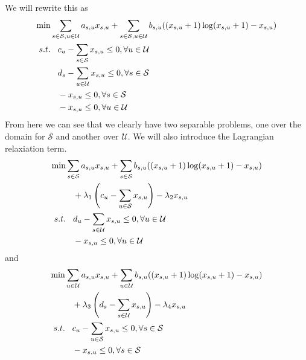 \documentclass[12pt,letter]{article}
\begin{document}
We will rewrite this as
\begin{align*}
\min\hspace{3mm}&\hspace{-3mm}\sum\limits_{s\in\mathcal{S},u\in\mathcal{U}}a_{s,u}x_{s,u} + 
	\sum\limits_{s\in\mathcal{S},u\in\mathcal{U}}b_{s,u}((x_{s,u}+1)\log(x_{s,u}+1)-x_{s,u})\\
s.t.\hspace{3mm} &c_u - \sum\limits_{s\in\mathcal{S}}x_{s,u}\leq 0, \forall u\in\mathcal{U}\\ 
     &d_s - \sum\limits_{u\in\mathcal{U}}x_{s,u}\leq 0, \forall s\in\mathcal{S}\\
     &-x_{s,u}\leq 0, \forall s\in\mathcal{S}\\
     &-x_{s,u}\leq 0, \forall u\in\mathcal{U}
\end{align*}
From here we can see that we clearly have two separable problems, one over the
domain for $\mathcal{S}$ and another over $\mathcal{U}$. We will also introduce
the Lagrangian relaxiation term.
\begin{align*}
\min\hspace{3mm}&\hspace{-3mm}\sum\limits_{s\in\mathcal{S}}a_{s,u}x_{s,u} + 
	\sum\limits_{s\in\mathcal{S}}b_{s,u}((x_{s,u}+1)\log(x_{s,u}+1)-x_{s,u}) \\
	&+ \lambda_1 \left(c_u - \sum\limits_{u\in\mathcal{S}}x_{s,u}\right) -\lambda_2x_{s,u}\\
 s.t.\hspace{3mm}    &d_u - \sum\limits_{s\in\mathcal{U}}x_{s,u}\leq 0, \forall u\in\mathcal{U}\\
     &-x_{s,u}\leq 0, \forall u\in\mathcal{U}\\
\end{align*}
and
\begin{align*}
\min\hspace{3mm}&\hspace{-3mm}\sum\limits_{u\in\mathcal{U}}a_{s,u}x_{s,u} + 
	\sum\limits_{u\in\mathcal{U}}b_{s,u}((x_{s,u}+1)\log(x_{s,u}+1)-x_{s,u}) \\
	&+ \lambda_3 \left(d_s - \sum\limits_{s\in\mathcal{U}}x_{s,u}\right) -\lambda_4 x_{s,u}\\
 s.t.\hspace{3mm}    &c_u - \sum\limits_{u\in\mathcal{S}}x_{s,u}\leq 0, \forall s\in\mathcal{S}\\
     &-x_{s,u}\leq 0, \forall s\in\mathcal{S}\\
\end{align*}
\end{document}
